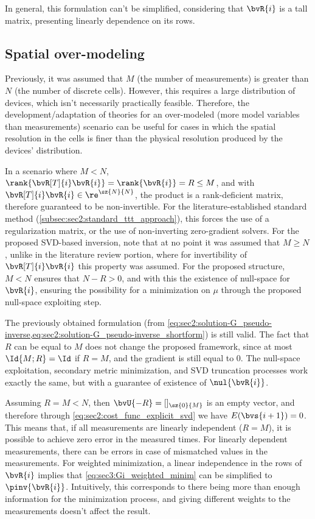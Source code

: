 {In general, this formulation can't be simplified, considering that $\bvR{i}$ is a tall matrix, presenting linearly dependence on its rows.


\subsection{Spatial over-modeling}
\label{subsec:spatial_under-over-_modeling}

Previously, it was assumed that $M$ (the number of measurements) is greater than $N$ (the number of discrete cells). However, this requires a large distribution of devices, which isn't necessarily practically feasible. Therefore, the development/adaptation of theories for an over-modeled (more model variables than measurements) scenario can be useful for cases in which the spatial resolution in the cells is finer than the physical resolution produced by the devices' distribution.

In a scenario where $M < N$,  $\rank{\bvR[T]{i} \bvR{i}} = \rank{\bvR{i}} = R \leq M$, and with $\bvR[T]{i} \bvR{i} \in \re^{\sz{N}{N}}$, the product is a rank-deficient matrix, therefore guaranteed to be non-invertible. For the literature-established standard method (\cref{subsec:sec2:standard_ttt_approach}), this forces the use of a regularization matrix, or the use of non-inverting zero-gradient solvers. For the proposed SVD-based inversion, note that at no point it was assumed that $M \geq N$, unlike in the literature review portion, where for invertibility of $\bvR[T]{i} \bvR{i}$ this property was assumed. For the proposed structure, $M < N$ ensures that $N-R > 0$, and with this the existence of null-space for $\bvR{i}$, ensuring the possibility for a minimization on $\mu$ through the proposed null-space exploiting step.

The previously obtained formulation (from \cref{eq:sec2:solution-G_pseudo-inverse,eq:sec2:solution-G_pseudo-inverse_shortform}) is still valid. The fact that $R$ can be equal to $M$ does not change the proposed framework, since at most $\Id{M;R} = \Id$ if $R = M$, and the gradient is still equal to $0$. The null-space exploitation, secondary metric minimization, and SVD truncation processes work exactly the same, but with a guarantee of existence of $\nul{\bvR{i}}$.

Assuming $R = M < N$, then $\bvU{-R} = []_{\sz{0}{M}}$ is an empty vector, and therefore through \cref{eq:sec2:cost_func_explicit_svd} we have $E(\bvs{i+1}) = 0$. This means that, if all measurements are linearly independent ($R=M$), it is possible to achieve zero error in the measured times. For linearly dependent measurements, there can be errors in case of mismatched values in the measurements. For weighted minimization, a linear independence in the rows of $\bvR{i}$ implies that \cref{eq:sec3:Gi_weighted_minim} can be simplified to $\pinv{\bvR{i}}$. Intuitively, this corresponds to there being more than enough information for the minimization process, and giving different weights to the measurements doesn't affect the result.

}

